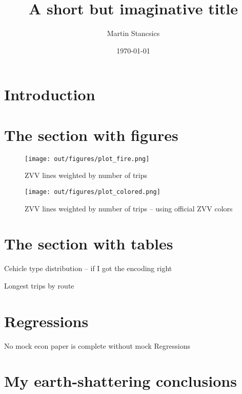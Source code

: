 \documentclass[a4paper]{article}
\author{Martin Stancsics}
\title{A short but imaginative title}
\date{\today}
\begin{document}
\maketitle

\section{Introduction}
\lipsum[1-3]

\section{The section with figures}
\lipsum[4]
\begin{figure}
    \centering
    \texttt{[image: out/figures/plot\_fire.png]}
    \caption{ZVV lines weighted by number of trips}
\end{figure}
\lipsum[5]
\begin{figure}
    \centering
    \texttt{[image: out/figures/plot\_colored.png]}
    \caption{ZVV lines weighted by number of trips -- using official ZVV colors}
\end{figure}

\section{The section with tables}
\lipsum[6]
\begin{table}
    \centering
    \caption{Cehicle type distribution -- if I got the encoding right}
    
\end{table}
\lipsum[7]
\begin{table}
    \centering
    \caption{Longest trips by route}
    
\end{table}

\section{Regressions}
No mock econ paper is complete without mock Regressions


\section{My earth-shattering conclusions}
\lipsum[8-9]
\end{document}
